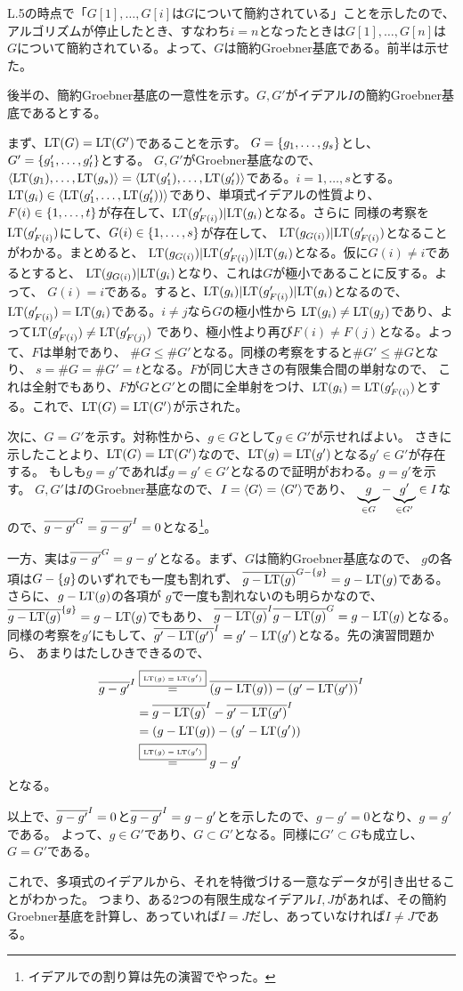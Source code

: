 \documentclass[9pt]{ltjsarticle}
\begin{document}
\begin{myproof}
L.5の時点で「$G[1],\dots,G[i]$は$G$について簡約されている」ことを示したので、
アルゴリズムが停止したとき、すなわち$i=n$となったときは$G[1],\dots,G[n]$は$G$について簡約されている。よって、$G$は簡約Groebner基底である。前半は示せた。

後半の、簡約Groebner基底の一意性を示す。$G,G'$がイデアル$I$の簡約Groebner基底であるとする。

まず、${\rm LT}(G) = {\rm LT}(G')$であることを示す。
$G=\left\{g_1,\dots,g_s\right\}$とし、$G'=\left\{g_1',\dots,g_t'\right\}$とする。
$G,G'$がGroebner基底なので、$\left\langle {\rm LT}(g_1),\dots,{\rm LT}(g_s) \right\rangle = \left\langle {\rm LT}(g_1'),\dots,{\rm LT}(g_t') \right\rangle$である。$i=1,\dots,s$とする。
${\rm LT}(g_i) \in \left\langle {\rm LT}(g_1',\dots,{\rm LT}(g_t')) \right\rangle$であり、単項式イデアルの性質より、
$F(i) \in \left\{1,\dots,t\right\}$が存在して、${\rm LT}(g_{F(i)}')|{\rm LT}(g_i)$となる。さらに
同様の考察を${\rm LT}(g'_{F(i)})$にして、$G(i)\in \left\{1,\dots,s\right\}$が存在して、
${\rm LT}(g_{G(i)})|{\rm LT}(g_{F(i)}')$となることがわかる。まとめると、
${\rm LT}(g_{G(i)})|{\rm LT}(g_{F(i)}')|{\rm LT}(g_{i})$となる。仮に$G(i)\neq i$であるとすると、
${\rm LT}(g_{G(i)})|{\rm LT}(g_i)$となり、これは$G$が極小であることに反する。よって、
$G(i)=i$である。すると、${\rm LT}(g_i)|{\rm LT}(g'_{F(i)})|{\rm LT}(g_i)$となるので、
${\rm LT}(g'_{F(i)})  = {\rm LT}(g_i)$である。$i\neq j$なら$G$の極小性から
${\rm LT}(g_i) \neq {\rm LT}( g_j)$であり、よって${\rm LT}(g'_{F(i)})\neq {\rm LT}(g'_{F(j)})$
であり、極小性より再び$F(i) \neq F(j)$となる。よって、$F$は単射であり、
$\# G \le \# G'$となる。同様の考察をすると$\# G' \le \# G$となり、
$s = \# G = \# G' = t$となる。$F$が同じ大きさの有限集合間の単射なので、
これは全射でもあり、$F$が$G$と$G'$との間に全単射をつけ、${\rm LT}(g_i) = {\rm LT}(g'_{F(i)})$とする。これで、${\rm LT}(G) = {\rm LT}(G')$が示された。

次に、$G=G'$を示す。対称性から、$g\in G$として$g\in G'$が示せればよい。
さきに示したことより、${\rm LT}(G) = {\rm LT}(G')$なので、${\rm LT}(g) = {\rm LT}(g')$となる$g' \in G'$が存在する。
もしも$g=g'$であれば$g  = g' \in G'$となるので証明がおわる。$g=g'$を示す。
$G,G'$は$I$のGroebner基底なので、$I=\left\langle G \right\rangle=\left\langle G' \right\rangle$であり、
$\underbrace{g}_{\in G}-\underbrace{g'}_{\in G'} \in I$なので、$\overline{g-g'}^{G} = \overline{g-g'}^{I} = 0$となる\footnote{イデアルでの割り算は先の演習でやった。}。

一方、実は$\overline{g-g'}^{G}=g-g'$となる。まず、$G$は簡約Groebner基底なので、
$g$の各項は$G-\left\{g\right\}$のいずれでも一度も割れず、
$\overline{g-{\rm LT}(g)}^{G-\left\{g\right\}} = g-{\rm LT}(g)$である。さらに、$g-{\rm LT}(g)$の各項が
$g$で一度も割れないのも明らかなので、$\overline{g-{\rm LT}(g)}^{\left\{g\right\}} = g-{\rm LT}(g)$でもあり、
$\overline{g-{\rm LT}(g)}^{I} \overline{g-{\rm LT}(g)}^{G} = g-{\rm LT}(g)$となる。
同様の考察を$g'$にもして、$\overline{g'-{\rm LT}(g')}^{I} = g'-{\rm LT}(g')$となる。先の演習問題から、
あまりはたしひきできるので、
\begin{align}
  \overline{g-g'}^{I}
  &\overset{\text{\fbox{\tiny ${\rm LT}(g)={\rm LT}(g')$}}}{=}
  \overline{(g-{\rm LT}(g))-(g'-{\rm LT}(g'))}^{I}\\
  &=
  \overline{g-{\rm LT}(g)}^{I} - \overline{g'-{\rm LT}(g')}^{I}\\
  &=
  (g-{\rm LT}(g)) - (g'-{\rm LT}(g'))\\
  &\overset{\text{\fbox{\tiny ${\rm LT}(g)={\rm LT}(g')$}}}{=}
  g-g'
\end{align}
となる。

以上で、$\overline{g-g'}^{I}=0$と$\overline{g-g'}^{I}=g-g'$とを示したので、$g-g'=0$となり、$g=g'$である。
よって、$g\in G'$であり、$G\subset G'$となる。同様に$G'\subset G$も成立し、$G=G'$である。
\end{myproof}

これで、多項式のイデアルから、それを特徴づける一意なデータが引き出せることがわかった。
つまり、ある2つの有限生成なイデアル$I,J$があれば、その簡約Groebner基底を計算し、あっていれば$I=J$だし、あっていなければ$I\neq J$である。
\end{document}
